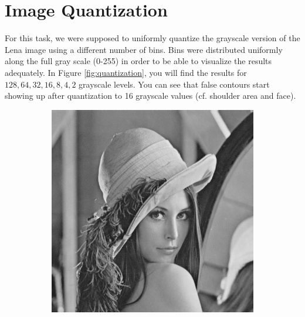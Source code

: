 \documentclass{article}
\begin{document}
\section{Image Quantization}
For this task, we were supposed to uniformly quantize the grayscale version of the Lena image using a different number of bins. Bins were distributed uniformly along the full gray scale (0-255) in order to be able to visualize the results adequately. In Figure \ref{fig:quantization}, you will find the results for $128, 64, 32, 16, 8, 4, 2$ grayscale levels. You can see that false contours start showing up after quantization to 16 grayscale values (cf. shoulder area and face).
\begin{figure}
        \centering
        \begin{subfigure}[c]{0.3\textwidth}
            \includegraphics[width=\textwidth]{images/lena-y_128.png}
        \end{subfigure}
        \hfill
        \begin{subfigure}[c]{0.3\textwidth}

\end{subfigure}
\end{figure}
\end{document}
